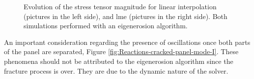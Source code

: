 \message{ !name(2020_EFM_MPM_Eigensoftening.tex)}\documentclass[preprint,12pt,a4paper]{elsarticle}
\begin{document}
\begin{figure}
\centering
{}
\caption{Evolution of the stress tensor magnitude for linear
  interpolation (pictures in the left side), and \acrshort{lme}
  (pictures in the right side). Both simulations performed with an
  eigenerosion algorithm.}
\label{fig:Stress-cracked-panel-mode-I}
\end{figure}
An important consideration regarding the presence of oscillations once
both parts of the panel are separated, Figure
\ref{fig:Reactions-cracked-panel-mode-I}. These phenomena should not be
attributed to the eigenerosion algorithm since the fracture process is
over. They are due to the dynamic nature of the solver.  
\end{document}
